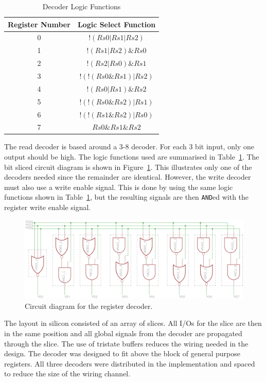 \begin{table}
\caption{Decoder Logic Functions}
\label{tab:reg:decoder}
\centering
\begin{tabular}{|c|c|}\hline
Register Number & Logic Select Function \\ \hline
0		&		$!( Rs0 | Rs1 | Rs2 )$ \\
1		&		$ !( Rs1 | Rs2 ) \& Rs0$	\\
2		&		$!( Rs2 | Rs0 ) \& Rs1$\\
3		&		$! ( ! ( Rs0 \& Rs1 ) | Rs2 )$	\\
4		&		$!( Rs0 | Rs1 ) \& Rs2$	\\
5		&		$! ( ! ( Rs0 \& Rs2 ) | Rs1 )$	\\
6		&		$! ( ! ( Rs1 \& Rs2 ) | Rs0 )$	\\
7		&		$Rs0 \& Rs1 \& Rs2$	\\ \hline
\end{tabular}

\end{table}

The read decoder is based around a 3-8 decoder. 
For each 3 bit input, only one output should be high. 
The logic functions used are summarised in Table~\ref{tab:reg:decoder}.
The bit sliced circuit diagram is shown in Figure~\ref{fig:reg:decoder}.
This illustrates only one of the decoders needed since the remainder are identical.
However, the write decoder must also use a write enable signal.
This is done by using the same logic functions shown in Table~\ref{tab:reg:decoder}, but the resulting signals are then \texttt{AND}ed with the register write enable signal. 

\begin{figure}
\centering
\includegraphics[width=\textwidth]{../../eagle/regBlock/regBlock_decoder.png}
\caption{Circuit diagram for the register decoder.}
\label{fig:reg:decoder}
\end{figure}

The layout in silicon consisted of an array of slices. 
All I/Os for the slice are then in the same position and all global signals from the decoder are propagated through the slice.
The use of tristate buffers reduces the wiring needed in the design. 
The decoder was designed to fit above the block of general purpose registers. 
All three decoders were distributed in the implementation and spaced to reduce the size of the wiring channel.
